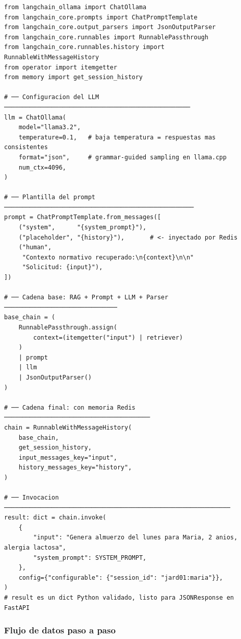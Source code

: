 \documentclass[12pt,a4paper]{article}
\begin{document}
\begin{lstlisting}[style=pythonstyle, caption={chain\_builder.py --- Cadena LCEL con RAG, memoria y parser JSON}]
from langchain_ollama import ChatOllama
from langchain_core.prompts import ChatPromptTemplate
from langchain_core.output_parsers import JsonOutputParser
from langchain_core.runnables import RunnablePassthrough
from langchain_core.runnables.history import RunnableWithMessageHistory
from operator import itemgetter
from memory import get_session_history

# ── Configuracion del LLM ───────────────────────────────────────────────────
llm = ChatOllama(
    model="llama3.2",
    temperature=0.1,   # baja temperatura = respuestas mas consistentes
    format="json",     # grammar-guided sampling en llama.cpp
    num_ctx=4096,
)

# ── Plantilla del prompt ────────────────────────────────────────────────────
prompt = ChatPromptTemplate.from_messages([
    ("system",      "{system_prompt}"),
    ("placeholder", "{history}"),       # <- inyectado por Redis
    ("human",
     "Contexto normativo recuperado:\n{context}\n\n"
     "Solicitud: {input}"),
])

# ── Cadena base: RAG + Prompt + LLM + Parser ───────────────────────────────
base_chain = (
    RunnablePassthrough.assign(
        context=(itemgetter("input") | retriever)
    )
    | prompt
    | llm
    | JsonOutputParser()
)

# ── Cadena final: con memoria Redis ────────────────────────────────────────
chain = RunnableWithMessageHistory(
    base_chain,
    get_session_history,
    input_messages_key="input",
    history_messages_key="history",
)

# ── Invocacion ──────────────────────────────────────────────────────────────
result: dict = chain.invoke(
    {
        "input": "Genera almuerzo del lunes para Maria, 2 anios, alergia lactosa",
        "system_prompt": SYSTEM_PROMPT,
    },
    config={"configurable": {"session_id": "jard01:maria"}},
)
# result es un dict Python validado, listo para JSONResponse en FastAPI
\end{lstlisting}

\subsubsection{Flujo de datos paso a paso}
\end{document}
